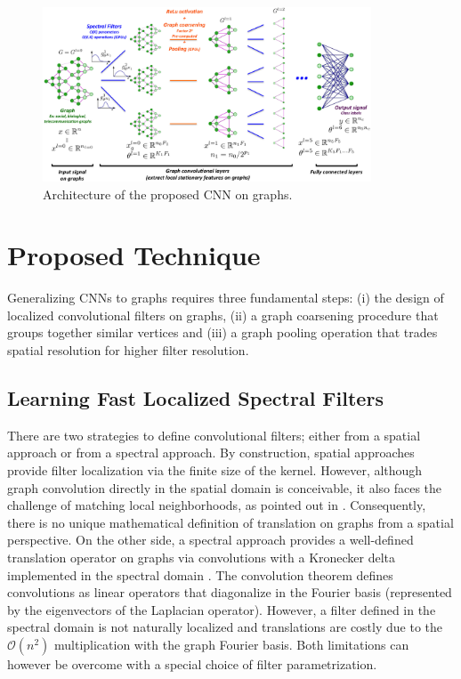 \documentclass{article}
\newcommand{\G}{\mathcal{G}}
\newcommand{\bO}{\mathcal{O}}
\begin{document}
\begin{figure}[t]
\centering
\includegraphics[width=0.87\textwidth]{illustrationCNNgraphs}
\caption{Architecture of the proposed CNN on graphs.
}
\label{fig_illustration}
\end{figure}

\section{Proposed Technique}

Generalizing CNNs to graphs requires three fundamental steps: (i) the design of
localized convolutional filters on graphs, (ii) a graph coarsening procedure
that groups together similar vertices and (iii) a graph pooling operation that
trades spatial resolution for higher filter resolution. 

\subsection{Learning Fast Localized Spectral Filters} \label{sec:filters}

There are two strategies to define convolutional filters; either from a spatial
approach or from a spectral approach. By construction, spatial approaches
provide filter localization via the finite size of the kernel. However,
although graph convolution directly in the spatial domain is conceivable, it
also faces the challenge of matching local neighborhoods, as pointed out in
\cite{art:BrunaZarembaSzlamLeCun13DLgraphs}. Consequently, there is no unique
mathematical definition of translation on graphs from a spatial perspective. On
the other side, a spectral approach provides a well-defined translation
operator on graphs via convolutions with a Kronecker delta implemented in the
spectral domain \cite{art:ShumanNarangFrossardOrtegaVandergheynst13ReviewSPG}.
The convolution theorem \cite{book:Mallat99wavelets} defines convolutions as
linear operators that diagonalize in the Fourier basis (represented by the
eigenvectors of the Laplacian operator). However, a filter defined in the
spectral domain is not naturally localized and translations are costly due to
the $\bO(n^2)$ multiplication with the graph Fourier basis. Both limitations
can however be overcome with a special choice of filter parametrization.
\end{document}
